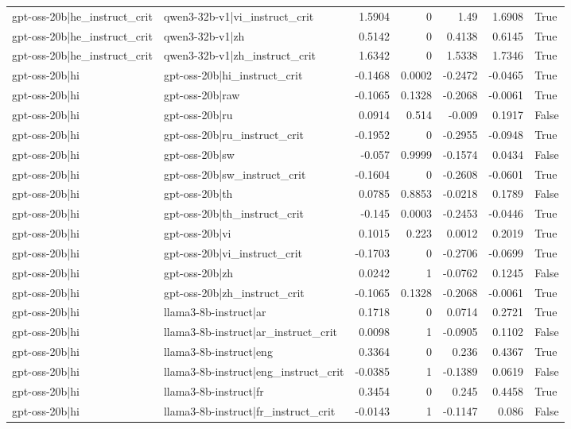 \begin{table}
\begin{tabular}{l l r r r r l}
gpt-oss-20b|he_instruct_crit & qwen3-32b-v1|vi_instruct_crit & 1.5904 & 0 & 1.49 & 1.6908 & True \\
gpt-oss-20b|he_instruct_crit & qwen3-32b-v1|zh & 0.5142 & 0 & 0.4138 & 0.6145 & True \\
gpt-oss-20b|he_instruct_crit & qwen3-32b-v1|zh_instruct_crit & 1.6342 & 0 & 1.5338 & 1.7346 & True \\
gpt-oss-20b|hi & gpt-oss-20b|hi_instruct_crit & -0.1468 & 0.0002 & -0.2472 & -0.0465 & True \\
gpt-oss-20b|hi & gpt-oss-20b|raw & -0.1065 & 0.1328 & -0.2068 & -0.0061 & True \\
gpt-oss-20b|hi & gpt-oss-20b|ru & 0.0914 & 0.514 & -0.009 & 0.1917 & False \\
gpt-oss-20b|hi & gpt-oss-20b|ru_instruct_crit & -0.1952 & 0 & -0.2955 & -0.0948 & True \\
gpt-oss-20b|hi & gpt-oss-20b|sw & -0.057 & 0.9999 & -0.1574 & 0.0434 & False \\
gpt-oss-20b|hi & gpt-oss-20b|sw_instruct_crit & -0.1604 & 0 & -0.2608 & -0.0601 & True \\
gpt-oss-20b|hi & gpt-oss-20b|th & 0.0785 & 0.8853 & -0.0218 & 0.1789 & False \\
gpt-oss-20b|hi & gpt-oss-20b|th_instruct_crit & -0.145 & 0.0003 & -0.2453 & -0.0446 & True \\
gpt-oss-20b|hi & gpt-oss-20b|vi & 0.1015 & 0.223 & 0.0012 & 0.2019 & True \\
gpt-oss-20b|hi & gpt-oss-20b|vi_instruct_crit & -0.1703 & 0 & -0.2706 & -0.0699 & True \\
gpt-oss-20b|hi & gpt-oss-20b|zh & 0.0242 & 1 & -0.0762 & 0.1245 & False \\
gpt-oss-20b|hi & gpt-oss-20b|zh_instruct_crit & -0.1065 & 0.1328 & -0.2068 & -0.0061 & True \\
gpt-oss-20b|hi & llama3-8b-instruct|ar & 0.1718 & 0 & 0.0714 & 0.2721 & True \\
gpt-oss-20b|hi & llama3-8b-instruct|ar_instruct_crit & 0.0098 & 1 & -0.0905 & 0.1102 & False \\
gpt-oss-20b|hi & llama3-8b-instruct|eng & 0.3364 & 0 & 0.236 & 0.4367 & True \\
gpt-oss-20b|hi & llama3-8b-instruct|eng_instruct_crit & -0.0385 & 1 & -0.1389 & 0.0619 & False \\
gpt-oss-20b|hi & llama3-8b-instruct|fr & 0.3454 & 0 & 0.245 & 0.4458 & True \\
gpt-oss-20b|hi & llama3-8b-instruct|fr_instruct_crit & -0.0143 & 1 & -0.1147 & 0.086 & False \\

\end{tabular}
\end{table}
